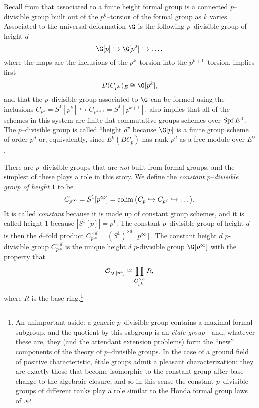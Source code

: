 Recall from  that associated to a finite height formal group is a connected \(p\)--divisible group built out of the \(p^k\)--torsion of the formal group as \(k\) varies. Associated to the universal deformation \(\G\) is the following \(p\)--divisible group of height \(d\)
\[
\G[p] \hookrightarrow \G[p^2] \hookrightarrow \ldots,
\]
where the maps are the inclusions of the \(p^k\)--torsion into the \(p^{k+1}\)--torsion.   implies first 
\[
B(C_{p^k})_{E} \cong \G[p^k],
\]
and that the \(p\)--divisible group associated to \(\G\) can be formed using the inclusions \(C_{p^k} = S^1[p^k] \hookrightarrow C_{p^{k+1}} = S^1[p^{k+1}]\). 
 also implies that all of the schemes in this system are finite flat commutative groups schemes over \(\operatorname{Spf} E^0\). The \(p\)--divisible group is called ``height \(d\)'' because \(\G[p]\) is a finite group scheme of order \(p^d\) or, equivalently, since \(E^0(BC_p)\) has rank \(p^d\) as a free module over \(E^0\).

There are \(p\)--divisible groups that are \emph{not} built from formal groups, and the simplest of these plays a role in this story.  We define the \textit{constant \(p\)--divisible group of height \(1\)} to be 
\[
C_{p^{\infty}} = S^1[p^\infty] = \operatorname*{colim} \big ( C_p \hookrightarrow C_{p^2} \hookrightarrow \ldots \big ).
\]
It is called \textit{constant} because it is made up of constant group schemes, and it is called height \(1\) because \(|S^1[p]| = p^1\).  The constant \(p\)--divisible group of height \(d\) is then the \(d\)--fold product \(C_{p^\infty}^{\times d} = (S^1)^{\times d}[p^\infty]\). The constant height \(d\) \(p\)-divisible group \(C_{p^\infty}^{\times d}\) is the unique height \(d\) \(p\)-divisible group $\G[p^{\infty}]$ with the property that
\[
\sheaf O_{\G[p^k]} \cong \prod_{C_{p^k}^{\times d}}R,
\]
where $R$ is the base ring.\footnote{An unimportant aside: a generic \(p\)--divisible group contains a maximal formal subgroup, and the quotient by this subgroup is an \textit{\'etale group}---and, whatever these are, they (and the attendant extension problems) form the ``new'' components of the theory of \(p\)--divisible groups.  In the case of a ground field of positive characteristic, \'etale groups admit a pleasant characterization: they are exactly those that become isomorphic to the constant group after base-change to the algebraic closure, and so in this sense the constant \(p\)--divisible groups of different ranks play a role similar to the Honda formal group laws of .}

